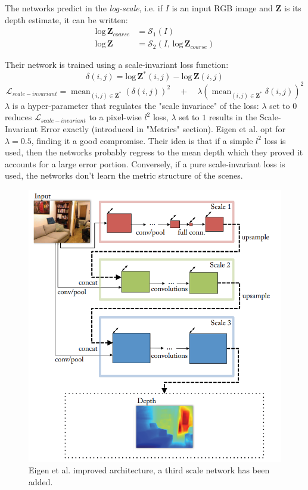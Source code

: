 The networks predict in the \textit{log-scale}, i.e. if $I$ is an input RGB image and $\mathbf{Z}$ is its depth estimate, it can be written:
\begin{equation}
	\begin{split}
	\text{log} \, \mathbf{Z}_{coarse} & = \mathcal{S}_{1}(I) \\
	\text{log} \, \mathbf{Z} & = \mathcal{S}_{2}(I, \, \text{log} \, \mathbf{Z}_{coarse})
	\end{split}
\end{equation}

Their network is trained using a scale-invariant loss function:
\[
	\delta(i, j) = \text{log} \, \mathbf{Z}^{*} (i, j) - \text{log} \, \mathbf{Z} (i, j)
\]\[
	\mathcal{L}_{scale-invariant} =
	\mathop{\text{mean}}_{(i, j) \in \mathbf{Z}^{*}} \left( \delta(i, j) \right)^{2} \quad +\quad
	\lambda \left( \mathop{\text{mean}}_{(i, j) \in \mathbf{Z}^{*}} \delta(i, j) \right) ^{2}
\]
$\lambda$ is a hyper-parameter that regulates the "scale invariace" of the loss: $\lambda$ set to $0$ reduces $\mathcal{L}_{scale-invariant}$ to a pixel-wise $l^{2}$ loss, $\lambda$ set to $1$ results in the Scale-Invariant Error exactly (introduced in "Metrics" section).
Eigen et al. opt for $\lambda = 0.5$, finding it a good compromise.
Their idea is that if a simple $l^{2}$ loss is used, then the networks probably regress to the mean depth which they proved it accounts for a large error portion.
Conversely, if a pure scale-invariant loss is used, the networks don't learn the metric structure of the scenes.

\begin{figure}
\centering
\includegraphics[scale=0.5]{figs/Eigen2}
\caption{Eigen et al. \cite{Eigen2} improved architecture, a third scale network has been added.}
\label{fig:Eigen2}
\end{figure}

